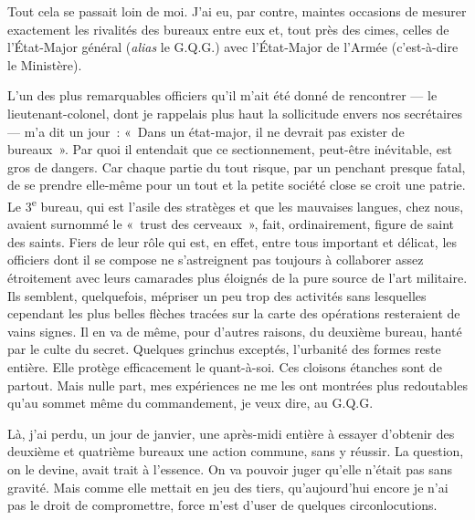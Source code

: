 \documentclass[french,twoside]{book} %
\begin{document}
Tout cela se passait loin de moi. J’ai eu, par contre, maintes occasions de mesurer exactement les rivalités des bureaux entre eux et, tout près des cimes, celles de l’État-Major général ({\itshape alias} le G.Q.G.) avec l’État-Major de l’Armée (c’est-à-dire le Ministère).\par
L’un des plus remarquables officiers qu’il m’ait été   donné de rencontrer — le lieutenant-colonel, dont je rappelais plus haut la sollicitude envers nos secrétaires — m’a dit un jour : « Dans un état-major, il ne devrait pas exister de bureaux ». Par quoi il entendait que ce sectionnement, peut-être inévitable, est gros de dangers. Car chaque partie du tout risque, par un penchant presque fatal, de se prendre elle-même pour un tout et la petite société close se croit une patrie. Le 3\textsuperscript{e} bureau, qui est l’asile des stratèges et que les mauvaises langues, chez nous, avaient surnommé le « trust des cerveaux », fait, ordinairement, figure de saint des saints. Fiers de leur rôle qui est, en effet, entre tous important et délicat, les officiers dont il se compose ne s’astreignent pas toujours à collaborer assez étroitement avec leurs camarades plus éloignés de la pure source de l’art militaire. Ils semblent, quelquefois, mépriser un peu trop des activités sans lesquelles cependant les plus belles flèches tracées sur la carte des opérations resteraient de vains signes. Il en va de même, pour d’autres raisons, du deuxième bureau, hanté par le culte du secret. Quelques grinchus exceptés, l’urbanité des formes reste entière. Elle protège efficacement le quant-à-soi. Ces cloisons étanches sont de partout. Mais nulle part, mes expériences ne me les ont montrées plus redoutables qu’au sommet même du commandement, je veux dire, au G.Q.G.\par
Là, j’ai perdu, un jour de janvier, une après-midi entière à essayer d’obtenir des deuxième et quatrième bureaux une action commune, sans y réussir. La question, on le devine, avait trait à l’essence. On va pouvoir juger qu’elle n’était pas sans gravité. Mais comme elle mettait en jeu des tiers, qu’aujourd’hui encore je n’ai pas le droit de compromettre, force m’est d’user de quelques circonlocutions.\par
\end{document}

